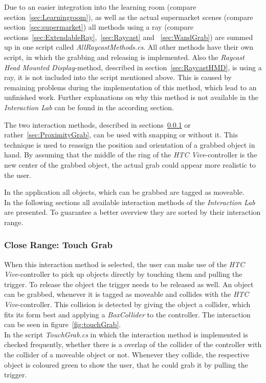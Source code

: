 Due to an easier integration into the learning room (compare section~\ref{sec:Learningroom}), as well as the actual supermarket scenes (compare section~\ref{sec:supermarket}) all methods using a ray (compare sections~\ref{sec:ExtendableRay},~\ref{sec:Raycast} and ~\ref{sec:WandGrab}) are summed up in one script called \textit{AllRaycastMethods.cs}. All other methods have their own script, in which the grabbing and releasing is implemented. Also the \textit{Raycast Head Mounted Display}-method, described in section~\ref{sec:RaycastHMD}, is using a ray, it is not included into the script mentioned above. This is caused by remaining problems during the implementation of this method, which lead to an unfinished work. Further explanations on why this method is not available in the \textit{Interaction Lab} can be found in the according section.

The two interaction methods, described in sections~\ref{sec:TouchGrab} or rather~\ref{sec:ProximityGrab}, can be used with snapping or without it. This technique is used to reassign the position and orientation of a grabbed object in hand. By assuming that the middle of the ring of the \textit{HTC Vive}-controller is the new center of the grabbed object, the actual grab could appear more realistic to the user. 

In the application all objects, which can be grabbed are tagged as moveable.\\

In the following sections all available interaction methods of the \textit{Interaction Lab} are presented. To guarantee a better overview they are sorted by their interaction range. 

\subsubsection{Close Range: Touch Grab} \label{sec:TouchGrab}
When this interaction method is selected, the user can make use of the \textit{HTC Vive}-controller to pick up objects directly by touching them and pulling the trigger. To release the object the trigger needs to be released as well. An object can be grabbed, whenever it is tagged as moveable and collides with the \textit{HTC Vive}-controller. This collision is detected by giving the object a collider, which fits its form best \cite{website:BoxCollider}\cite{website:SphereCollider} and applying a \textit{BoxCollider} to the controller. The interaction can be seen in figure~\ref{fig:touchGrab}. \\
In the script \textit{TouchGrab.cs} in which the interaction method is implemented is checked frequently, whether there is a overlap of the collider of the controller with the collider of a moveable object or not. Whenever they collide, the respective object is coloured green to show the user, that he could grab it by pulling the trigger. 


